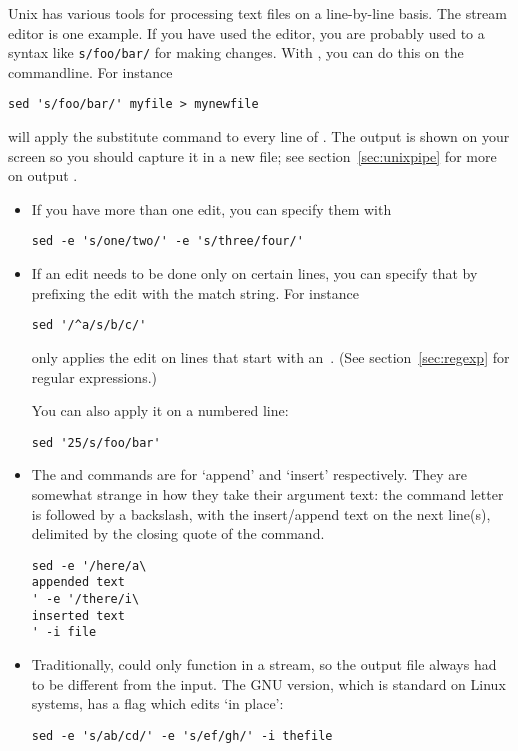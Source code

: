 Unix has various tools for processing text files on a line-by-line
basis.
The stream editor  is one example. If you have used the
 editor, you are probably used to a syntax like
\verb+s/foo/bar/+ for making changes.
With , you can do this on the commandline.
For instance
\begin{lstlisting}
sed 's/foo/bar/' myfile > mynewfile
\end{lstlisting}
will apply the substitute command  to every line of
. The output is shown on your screen so you should capture
it in a new file; see section~\ref{sec:unixpipe} for more on output
.

\begin{itemize}
\item If you have more than one edit, you can specify them with
\begin{lstlisting}
sed -e 's/one/two/' -e 's/three/four/'
\end{lstlisting}
\item If an edit needs to be done only on certain lines, you can
  specify that by prefixing the edit with the match string. For instance
\begin{lstlisting}
sed '/^a/s/b/c/'
\end{lstlisting}
only applies the edit on lines that start with an~. (See
section~\ref{sec:regexp} for regular expressions.)

You can also apply it on a numbered line:
\begin{lstlisting}
sed '25/s/foo/bar'
\end{lstlisting}
\item The  and  commands are for `append' and `insert' respectively.
  They are somewhat strange in how they take their argument text:
  the command letter is followed by a backslash, with the insert/append
  text on the next line(s), delimited by the closing quote of the command.
\begin{lstlisting}
sed -e '/here/a\
appended text
' -e '/there/i\
inserted text
' -i file
\end{lstlisting}
\item Traditionally,  could only function in a stream, so
  the output file always had to be different from the input. The GNU
  version, which is standard on Linux systems, has a flag \n{-i} which
  edits `in place':
\begin{lstlisting}
sed -e 's/ab/cd/' -e 's/ef/gh/' -i thefile
\end{lstlisting}
\end{itemize}

